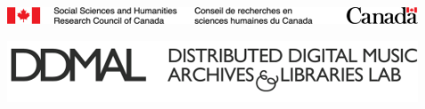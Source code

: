 \documentclass[final]{beamer}
\begin{document}
\begin{frame}[fragile,t]
\begin{columns}
\begin{column}{0.47\textwidth}
\begin{block}{}
            \includegraphics[scale=1.4]{images/SSHRC_logo}

            \includegraphics[scale=0.35]{images/ddmal_logo_large}
            \hspace{2cm}
        \end{block}

    \end{column}

    \begin{column}{0.00\textwidth}
    \end{column}

    \begin{column}{0.47\textwidth}
        
        \vspace{2.2cm}


\end{column}
\end{columns}
\end{frame}
\end{document}
